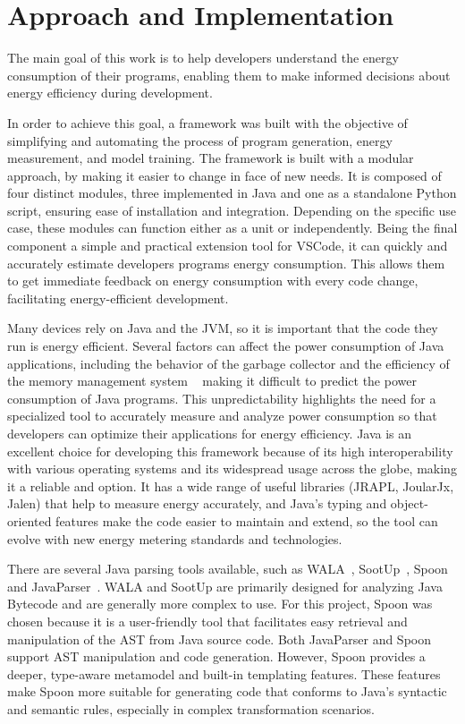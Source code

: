 \chapter{Approach and Implementation}\label{chapter:approach}



{\color{blue}The main goal of this work is to help developers understand the energy consumption of their programs, enabling them to make informed decisions about energy efficiency during development.

In order to achieve this goal, a framework was built with the objective of simplifying and automating the process of program generation, energy measurement, and model training. The framework is built with a modular approach, by making it easier to change in face of new needs. It is composed of four distinct modules, three implemented in Java and one as a standalone Python script, ensuring ease of installation and integration. Depending on the specific use case, these modules can function either as a unit or independently. Being the final component a simple and practical extension tool for VSCode, it can quickly and accurately estimate developers programs energy consumption. This allows them to get immediate feedback on energy consumption with every code change, facilitating energy-efficient development.}



Many devices rely on Java and the JVM, so it is important that the code they run is energy efficient. Several factors can affect the power consumption of Java applications, including the behavior of the garbage collector and the efficiency of the memory management system ~\cite{10.5555/1267847.1267870} making it difficult to predict the power consumption of Java programs. This unpredictability highlights the need for a specialized tool to accurately measure and analyze power consumption so that developers can optimize their applications for energy efficiency.
Java is an excellent choice for developing this framework because of its high interoperability with various operating systems and its widespread usage across the globe, making it a reliable and option. It has a wide range of useful libraries (JRAPL, JoularJx, Jalen) that help to measure energy accurately, and Java's typing and object-oriented features make the code easier to maintain and extend, so the tool can evolve with new energy metering standards and technologies.

There are several Java parsing tools available, such as WALA~\cite{wala_main}, SootUp~\cite{sootup_main}, Spoon~\cite{spoon_main} and JavaParser~\cite{javaParser}. WALA and SootUp are primarily designed for analyzing Java Bytecode and are generally more complex to use. For this project, Spoon was chosen because it is a user-friendly tool that facilitates easy retrieval and manipulation of the AST from Java source code. Both JavaParser and Spoon support AST manipulation and code generation. However, Spoon provides a deeper, type-aware metamodel and built-in templating features. These features make Spoon more suitable for generating code that conforms to Java’s syntactic and semantic rules, especially in complex transformation scenarios.



